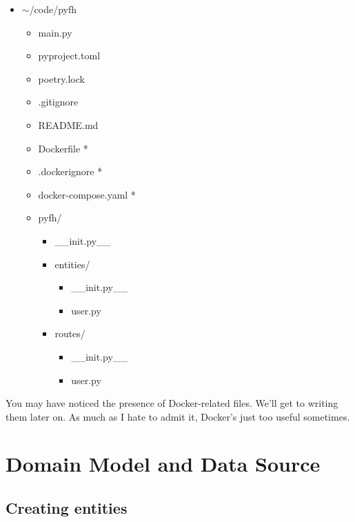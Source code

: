 \documentclass[14pt]{extarticle}
\begin{document}
{\ttfamily
\begin{itemize}
    \item{$\sim$/code/pyfh}
        \begin{itemize}
            \item{main.py}
            \item{pyproject.toml}
            \item{poetry.lock}
            \item{.gitignore}
            \item{README.md}
            \item{Dockerfile *}
            \item{.dockerignore *}
            \item{docker-compose.yaml *}
            \item{pyfh/}
                \begin{itemize}
                    \item{\_\_init.py\_\_}
                    \item{entities/}
                        \begin{itemize}
                            \item{\_\_init.py\_\_}
                            \item{user.py}
                        \end{itemize}
                    \item{routes/}
                        \begin{itemize}
                            \item{\_\_init.py\_\_}
                            \item{user.py}
                        \end{itemize}
                \end{itemize}
        \end{itemize}
\end{itemize}
}

You may have noticed the presence of Docker-related files. We'll get to writing them later on. As much as I hate to admit it, Docker's just too useful sometimes.

\section{Domain Model and Data Source}

\subsection{Creating entities}
\end{document}

